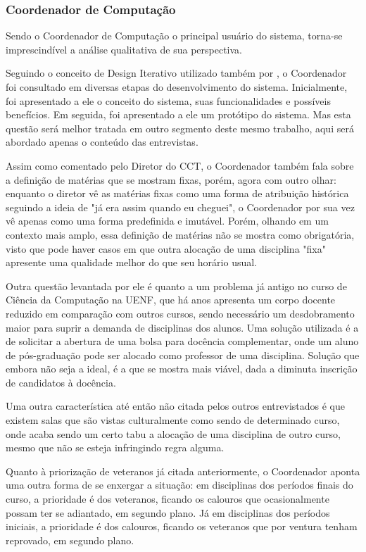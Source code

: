     \subsubsection{Coordenador de Computação} %

        Sendo o Coordenador de Computação o principal usuário do sistema, torna-se imprescindível a análise qualitativa de sua perspectiva.

        Seguindo o conceito de Design Iterativo utilizado também por \cite{andre_interaction_2018}, o Coordenador foi consultado em diversas etapas do desenvolvimento do sistema. Inicialmente, foi apresentado a ele o conceito do sistema, suas funcionalidades e possíveis benefícios. Em seguida, foi apresentado a ele um protótipo do sistema. Mas esta questão será melhor tratada em outro segmento deste mesmo trabalho, aqui será abordado apenas o conteúdo das entrevistas.

        Assim como comentado pelo Diretor do CCT, o Coordenador também fala sobre a definição de matérias que se mostram fixas, porém, agora com outro olhar: enquanto o diretor vê as matérias fixas como uma forma de atribuição histórica seguindo a ideia de "já era assim quando eu cheguei", o Coordenador por sua vez vê apenas como uma forma predefinida e imutável. Porém, olhando em um contexto mais amplo, essa definição de matérias não se mostra como obrigatória, visto que pode haver casos em que outra alocação de uma disciplina "fixa" apresente uma qualidade melhor do que seu horário usual.

        Outra questão levantada por ele é quanto a um problema já antigo no curso de Ciência da Computação na UENF, que há anos apresenta um corpo docente reduzido em comparação com outros cursos, sendo necessário um desdobramento maior para suprir a demanda de disciplinas dos alunos. Uma solução utilizada é a de solicitar a abertura de uma bolsa para docência complementar, onde um aluno de pós-graduação pode ser alocado como professor de uma disciplina. Solução que embora não seja a ideal, é a que se mostra mais viável, dada a diminuta inscrição de candidatos à docência.

        Uma outra característica até então não citada pelos outros entrevistados é que existem salas que são vistas culturalmente como sendo de determinado curso, onde acaba sendo um certo tabu a alocação de uma disciplina de outro curso, mesmo que não se esteja infringindo regra alguma.

        Quanto à priorização de veteranos já citada anteriormente, o Coordenador aponta uma outra forma de se enxergar a situação: em disciplinas dos períodos finais do curso, a prioridade é dos veteranos, ficando os calouros que ocasionalmente possam ter se adiantado, em segundo plano. Já em disciplinas dos períodos iniciais, a prioridade é dos calouros, ficando os veteranos que por ventura tenham reprovado, em segundo plano.

